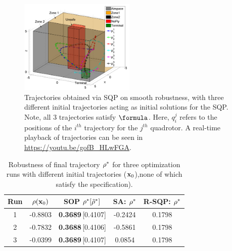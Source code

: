 

\begin{figure}[t]
\centering
\includegraphics[width=0.49\textwidth]{figures/QuadTrajs_u_scissored}
\vspace{-10pt}
\caption{{\small Trajectories obtained via SQP on smooth robustness, with three different initial trajectories acting as initial solutions for the SQP. Note, all 3 trajectories satisfy $\formula$. Here, $q_{i}^j$ refers to the positions of the $i^{th}$ trajectory for the $j^{th}$ quadrotor. 
A real-time playback of trajectories can be seen in \protect\url{https://youtu.be/gofB_HLwFGA}.}}
\vspace{-10pt}
\label{fig:quad_ssqp}
\end{figure}


%
\begin{table}[htb]
\small
\begin{center}
\caption{{\small Robustness of final trajectory $\rho^*$ for three optimization runs with different initial trajectories ($\mathbf{x}_0$),none of which satisfy the specification).}}
\vspace{-5pt}
\label{tbl:opt_performance}
\begin{tabular} {|c|c|c|c|c|}
	\hline
	\textbf{Run} & $\rho(\mathbf{x}_0) $ &SOP $\rho^* [\tilde{\rho}^*]$ & SA: $\rho^*$ & R-SQP: $\rho^*$\\ \hline
	1 & -0.8803 & \textbf{0.3689}\,[0.4107] & -0.2424 & 0.1798 \\ \hline
	2 & -0.7832 & \textbf{0.3688}\,[0.4106] & -0.5861 & 0.1798 \\ \hline
	3 & -0.0399 & \textbf{0.3689}\,[0.4107] & 0.0854 & 0.1798 \\ \hline
\end{tabular}	
\end{center}
\vspace{-20pt}
\end{table}


